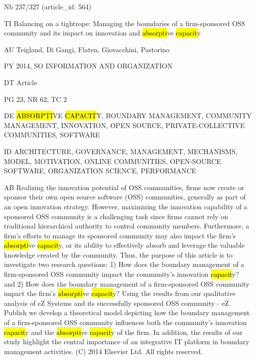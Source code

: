 \documentclass[a4paper]{article}
\begin{document}
\vspace*{-2cm}
Nb \tabto{0cm}237/327 (article\_id: 564)\par
TI \tabto{0cm}Balancing on a tightrope: Managing the boundaries of a firm-sponsored OSS community and its impact on innovation and \hl{absorpti}ve \hl{capacit}y\par
AU \tabto{0cm}Teigland, Di Gangi, Flaten, Giovacchini, Pastorino\par
PY \tabto{0cm}2014, SO INFORMATION AND ORGANIZATION\par
DT \tabto{0cm}Article\par
PG \tabto{0cm}23, NR 62, TC 2\par
DE \tabto{0cm}\hl{ABSORPTI}VE \hl{CAPACIT}Y, BOUNDARY MANAGEMENT, COMMUNITY MANAGEMENT, INNOVATION, OPEN SOURCE, PRIVATE-COLLECTIVE COMMUNITIES, SOFTWARE\par
ID \tabto{0cm}ARCHITECTURE, GOVERNANCE, MANAGEMENT, MECHANISMS, MODEL, MOTIVATION, ONLINE COMMUNITIES, OPEN-SOURCE SOFTWARE, ORGANIZATION SCIENCE, PERFORMANCE\par
AB \tabto{0cm}Realizing the innovation potential of OSS communities, firms now create or sponsor their own open source software (OSS) communities, generally as part of an open innovation strategy. However, maximizing the innovation capability of a sponsored OSS community is a challenging task since firms cannot rely on traditional hierarchical authority to control community members. Furthermore, a firm's efforts to manage its sponsored community may also impact the firm's \hl{absorpti}ve \hl{capacit}y, or its ability to effectively absorb and leverage the valuable knowledge created by the community. Thus, the purpose of this article is to investigate two research questions: 1) How does the boundary management of a firm-sponsored OSS community impact the community's innovation \hl{capacit}y? and 2) How does the boundary management of a firm-sponsored OSS community impact the firm's \hl{absorpti}ve \hl{capacit}y? Using the results from our qualitative analysis of eZ Systems and its successfully sponsored OSS community - eZ Publish we develop a theoretical model depicting how the boundary management of a firm-sponsored OSS community influences both the community's innovation \hl{capacit}y and the \hl{absorpti}ve \hl{capacit}y of the firm. In addition, the results of our study highlight the central importance of an integrative IT platform in boundary management activities. (C) 2014 Elsevier Ltd. All rights reserved.\par
\clearpage
\end{document}
